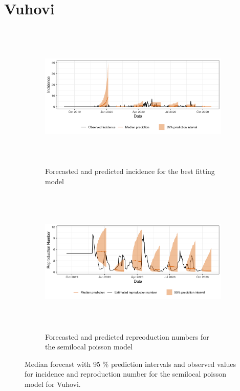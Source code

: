  \section{ Vuhovi }\begin{figure}[H]\begin{subfigure}{\textwidth}  \centering  \includegraphics[width=0.9\linewidth, height=7cm]{../output/Vuhovi_predictions.png}  \caption{Forecasted and predicted incidence for the best fitting model}\end{subfigure}

\begin{subfigure}{\textwidth}  \centering  \includegraphics[width=0.9\linewidth, height=7cm]{../output/Vuhovi_Rs.png}  \caption{Forecasted and predicted repreoduction numbers for the semilocal poisson model}\end{subfigure}  \caption{Median forecast with 95 \% prediction intervals and observed values for incidence and reproduction number for the semilocal poisson model for Vuhovi.}\end{figure}

